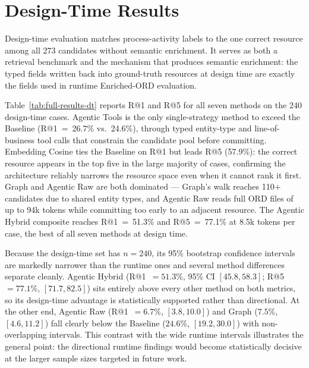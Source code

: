 \section{Design-Time Results}
\label{appendix:dt-results}

Design-time evaluation matches process-activity labels to the one correct resource among all 273 candidates without semantic enrichment. It serves as both a retrieval benchmark and the mechanism that produces semantic enrichment: the typed fields written back into ground-truth resources at design time are exactly the fields used in runtime Enriched-ORD evaluation.

Table~\ref{tab:full-results-dt} reports R@1 and R@5 for all seven methods on the 240 design-time cases. Agentic Tools is the only single-strategy method to exceed the Baseline (R@1~=~26.7\% vs.\ 24.6\%), through typed entity-type and line-of-business tool calls that constrain the candidate pool before committing. Embedding Cosine ties the Baseline on R@1 but leads R@5 (57.9\%): the correct resource appears in the top five in the large majority of cases, confirming the architecture reliably narrows the resource space even when it cannot rank it first. Graph and Agentic Raw are both dominated --- Graph's walk reaches 110$+$ candidates due to shared entity types, and Agentic Raw reads full ORD files of up to 94k tokens while committing too early to an adjacent resource. The Agentic Hybrid composite reaches R@1~=~51.3\% and R@5~=~77.1\% at 8.5k tokens per case, the best of all seven methods at design time.

Because the design-time set has $n{=}240$, its 95\% bootstrap confidence intervals are markedly narrower than the runtime ones and several method differences separate cleanly. Agentic Hybrid (R@1~$=51.3\%$, 95\% CI $[45.8, 58.3]$; R@5~$=77.1\%$, $[71.7, 82.5]$) sits entirely above every other method on both metrics, so its design-time advantage is statistically supported rather than directional. At the other end, Agentic Raw (R@1~$=6.7\%$, $[3.8, 10.0]$) and Graph ($7.5\%$, $[4.6, 11.2]$) fall clearly below the Baseline ($24.6\%$, $[19.2, 30.0]$) with non-overlapping intervals. This contrast with the wide runtime intervals illustrates the general point: the directional runtime findings would become statistically decisive at the larger sample sizes targeted in future work.

